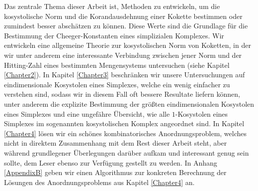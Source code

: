 \documentclass[11pt,english,onehalfspacing,headsepline]{MastersDoctoralThesis}
\begin{document}

\begin{Zusammenfassung}
Das zentrale Thema dieser Arbeit ist, Methoden zu entwickeln, um die kosystolische Norm und die Korandausdehnung einer Kokette bestimmen oder zumindest besser abschätzen zu können. Diese Werte sind die Grundlage für die Bestimmung der Cheeger-Konstanten eines simplizialen Komplexes. Wir entwickeln eine allgemeine Theorie zur kosystolischen Norm von Koketten, in der wir unter anderem eine interessante Verbindung zwischen jener Norm und der Hitting-Zahl eines bestimmten Mengensystems untersuchen (siehe Kapitel \ref{Chapter2}). In Kapitel \ref{Chapter3} beschränken wir unsere Untersuchungen auf eindimensionale Kosystolen eines Simplexes, welche ein wenig einfacher zu verstehen sind, sodass wir in diesem Fall oft bessere Resultate liefern können, unter anderem die explizite Bestimmung der größten eindimensionalen Kosystolen eines Simplexes und eine ungefähre Übersicht, wie alle \(1\)-Kosystolen eines Simplexes im sogenannten kosystolischen Komplex angeordnet sind. In Kapitel \ref{Chapter4} lösen wir ein schönes kombinatorisches Anordnungsproblem, welches nicht in direktem Zusammenhang mit dem Rest dieser Arbeit steht, aber während grundlegener Überlegungen darüber aufkam und interessant genug sein sollte, dem Leser ebenso zur Verfügung gestellt zu werden. In Anhang \ref{AppendixB} geben wir einen Algorithmus zur konkreten Berechnung der Lösungen des Anordnungsproblems aus Kapitel \ref{Chapter4} an.
\end{Zusammenfassung}

\end{document}
